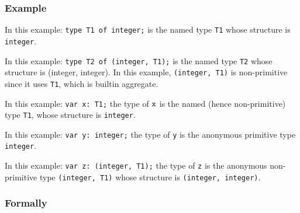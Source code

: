 \subsubsection{Example}
In this example:
\texttt{type T1 of integer;} is the named type \texttt{T1}
whose structure is \texttt{integer}.

In this example:
\texttt{type T2 of (integer, T1);}
is the named type \texttt{T2} whose structure is (integer, integer). In this
example, \texttt{(integer, T1)} is non-primitive since it uses \texttt{T1}, which is builtin aggregate.

In this example:
\texttt{var x: T1;}
the type of $\texttt{x}$ is the named (hence non-primitive) type \texttt{T1}, whose structure
is \texttt{integer}.

In this example:
\texttt{var y: integer;}
the type of \texttt{y} is the anonymous primitive type \texttt{integer}.

In this example:
\texttt{var z: (integer, T1);}
the type of \texttt{z} is the anonymous non-primitive type
\texttt{(integer, T1)} whose structure is \texttt{(integer, integer)}.


\subsubsection{Formally}

